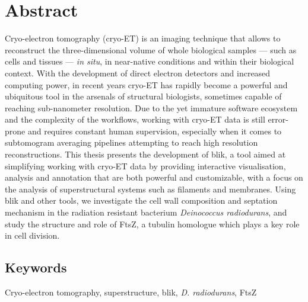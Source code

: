 \section*{Abstract}

Cryo-electron tomography (cryo-ET) is an imaging technique that allows to reconstruct the three-dimensional volume of whole biological samples --- such as cells and tissues --- \textit{in situ}, in near-native conditions and within their biological context.
With the development of direct electron detectors and increased computing power, in recent years cryo-ET has rapidly become a powerful and ubiquitous tool in the arsenals of structural biologists, sometimes capable of reaching sub-nanometer resolution.
Due to the yet immature software ecosystem and the complexity of the workflows, working with cryo-ET data is still error-prone and requires constant human supervision, especially when it comes to subtomogram averaging pipelines attempting to reach high resolution reconstructions.
This thesis presents the development of blik, a tool aimed at simplifying working with cryo-ET data by providing interactive visualisation, analysis and annotation that are both powerful and customizable, with a focus on the analysis of superstructural systems such as filaments and membranes.
Using blik and other tools, we investigate the cell wall composition and septation mechanism in the radiation resistant bacterium \textit{Deinococcus radiodurans}, and study the structure and role of FtsZ, a tubulin homologue which plays a key role in cell division.

\subsection*{Keywords}
Cryo-electron tomography, superstructure, blik, \textit{D. radiodurans}, FtsZ

\newpage
